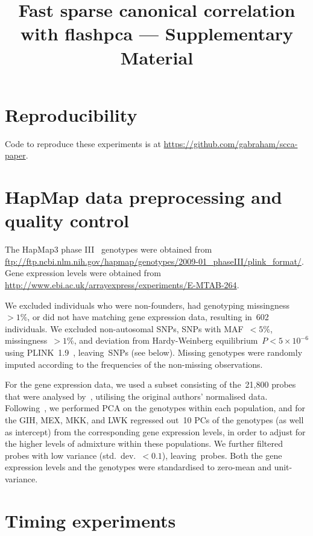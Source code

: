 \documentclass[a4paper,12pt]{article}
\title{Fast sparse canonical correlation with flashpca --- Supplementary
Material}
\begin{document}
\maketitle

\section{Reproducibility}

Code to reproduce these experiments is at
\url{https://github.com/gabraham/scca-paper}.

\section{HapMap data preprocessing and quality control}

The HapMap3 phase III~\citep{hapmap2010} genotypes were obtained from
\url{ftp://ftp.ncbi.nlm.nih.gov/hapmap/genotypes/2009-01_phaseIII/plink_format/}.
Gene expression levels were obtained from
\url{http://www.ebi.ac.uk/arrayexpress/experiments/E-MTAB-264}.

We excluded individuals who were non-founders, had genotyping
missingness~${>}1\%$, or did not have matching gene expression data,
resulting in~602 individuals. We excluded non-autosomal SNPs, SNPs with
MAF~${<}5\%$, missingness~${>}1\%$, and deviation from Hardy-Weinberg
equilibrium~$P{<}5\times10^{-6}$ using PLINK~1.9~\citep{purcell2007,Chang2015},
leaving~\nsnps SNPs (see below). Missing genotypes were randomly imputed
according to the frequencies of the non-missing observations.

For the gene expression data, we used a subset consisting of the~21,800 probes
that were analysed by~\citep{Stranger2012}, utilising the original authors'
normalised data. Following~\citep{Stranger2012}, we performed PCA on the
genotypes within each population, and for the GIH, MEX, MKK, and LWK regressed
out~10 PCs of the genotypes (as well as intercept) from the corresponding gene
expression levels, in order to adjust for the higher levels of admixture within
these populations.  We further filtered probes with low variance
(std.~dev.~${<}0.1$), leaving~\ngenes probes. Both the gene expression levels and
the genotypes were standardised to zero-mean and unit-variance.

\section{Timing experiments}
\end{document}
